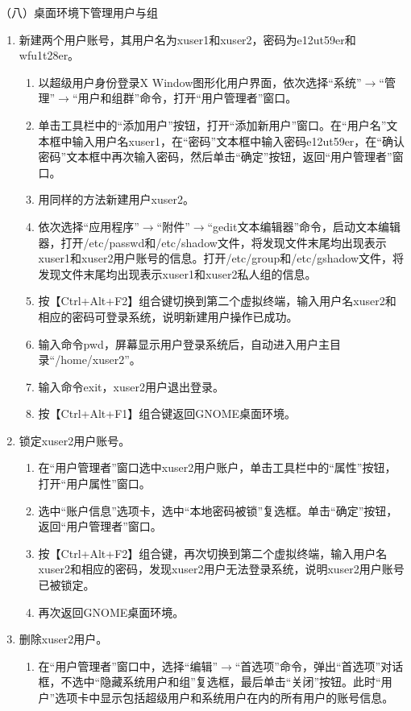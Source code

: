 \vspace{0.1in}
（八）桌面环境下管理用户与组
\begin{enumerate}
  \item 新建两个用户账号，其用户名为xuser1和xuser2，密码为e12ut59er和wfu1t28er。
    \begin{enumerate}
      \item 以超级用户身份登录X Window图形化用户界面，依次选择“系统”$\rightarrow$“管理”$\rightarrow$“用户和组群”命令，打开“用户管理者”窗口。
      \item 单击工具栏中的“添加用户”按钮，打开“添加新用户”窗口。在“用户名”文本框中输入用户名xuser1，在“密码”文本框中输入密码e12ut59er，在“确认密码”文本框中再次输入密码，然后单击“确定”按钮，返回“用户管理者”窗口。
      \item 用同样的方法新建用户xuser2。
      \item 依次选择“应用程序”$\rightarrow$“附件”$\rightarrow$“gedit文本编辑器”命令，启动文本编辑器，打开/etc/passwd和/etc/shadow文件，将发现文件末尾均出现表示xuser1和xuser2用户账号的信息。打开/etc/group和/etc/gshadow文件，将发现文件末尾均出现表示xuser1和xuser2私人组的信息。
      \item 按【Ctrl+Alt+F2】组合键切换到第二个虚拟终端，输入用户名xuser2和相应的密码可登录系统，说明新建用户操作已成功。
      \item 输入命令pwd，屏幕显示用户登录系统后，自动进入用户主目录“/home/xuser2”。
      \item 输入命令exit，xuser2用户退出登录。
      \item 按【Ctrl+Alt+F1】组合键返回GNOME桌面环境。
    \end{enumerate}
  \item 锁定xuser2用户账号。
    \begin{enumerate}
      \item 在“用户管理者”窗口选中xuser2用户账户，单击工具栏中的“属性”按钮，打开“用户属性”窗口。
      \item 选中“账户信息”选项卡，选中“本地密码被锁”复选框。单击“确定”按钮，返回“用户管理者”窗口。
      \item 按【Ctrl+Alt+F2】组合键，再次切换到第二个虚拟终端，输入用户名xuser2和相应的密码，发现xuser2用户无法登录系统，说明xuser2用户账号已被锁定。
      \item 再次返回GNOME桌面环境。
    \end{enumerate}
  \item 删除xuser2用户。
    \begin{enumerate}
      \item 在“用户管理者”窗口中，选择“编辑”$\rightarrow$“首选项”命令，弹出“首选项”对话框，不选中“隐藏系统用户和组”复选框，最后单击“关闭”按钮。此时“用户”选项卡中显示包括超级用户和系统用户在内的所有用户的账号信息。

\end{enumerate}
\end{enumerate}
